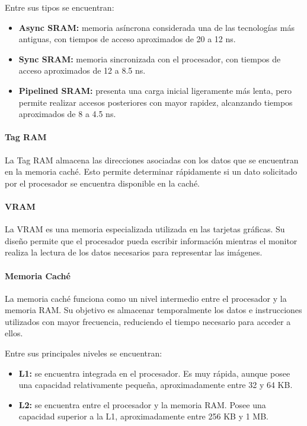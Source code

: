 \documentclass[10pt]{article}
\begin{document}
Entre sus tipos se encuentran:

\begin{itemize}
\item \textbf{Async SRAM:} memoria asíncrona considerada una de las tecnologías más antiguas, con tiempos de acceso aproximados de 20 a 12 ns.

\item \textbf{Sync SRAM:} memoria sincronizada con el procesador, con tiempos de acceso aproximados de 12 a 8.5 ns.

\item \textbf{Pipelined SRAM:} presenta una carga inicial ligeramente más lenta, pero permite realizar accesos posteriores con mayor rapidez, alcanzando tiempos aproximados de 8 a 4.5 ns.

\end{itemize}

\paragraph{Tag RAM}

La Tag RAM almacena las direcciones asociadas con los datos que se encuentran en la memoria caché. Esto permite determinar rápidamente si un dato solicitado por el procesador se encuentra disponible en la caché.

\paragraph{VRAM}

La VRAM es una memoria especializada utilizada en las tarjetas gráficas. Su diseño permite que el procesador pueda escribir información mientras el monitor realiza la lectura de los datos necesarios para representar las imágenes.

\paragraph{Memoria Caché}

La memoria caché funciona como un nivel intermedio entre el procesador y la memoria RAM. Su objetivo es almacenar temporalmente los datos e instrucciones utilizados con mayor frecuencia, reduciendo el tiempo necesario para acceder a ellos.

Entre sus principales niveles se encuentran:

\begin{itemize}
\item \textbf{L1:} se encuentra integrada en el procesador. Es muy rápida, aunque posee una capacidad relativamente pequeña, aproximadamente entre 32 y 64 KB.

\item \textbf{L2:} se encuentra entre el procesador y la memoria RAM. Posee una capacidad superior a la L1, aproximadamente entre 256 KB y 1 MB.

\end{itemize}
\end{document}
